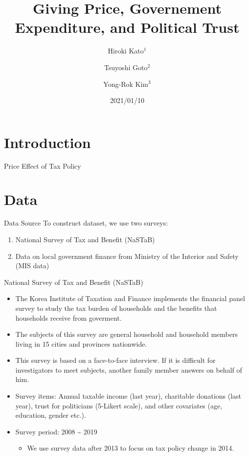 \documentclass[
  ignorenonframetext,
]{beamer}
\title{Giving Price, Governement Expenditure, and Political Trust}
\author{Hiroki Kato\(^1\) \and Tsuyoshi Goto\(^2\) \and Yong-Rok
Kim\(^3\)}
\date{2021/01/10}
\institute{\(^1\)Osaka University \and \(^2\)Chiba
University \and \(^3\)Kobe University}
\providecommand{\tightlist}{%
  \setlength{\itemsep}{0pt}\setlength{\parskip}{0pt}}
\begin{document}
\frame{\titlepage}

\hypertarget{introduction}{%
\section{Introduction}\label{introduction}}

\begin{frame}{Price Effect of Tax Policy}
\protect\hypertarget{price-effect-of-tax-policy}{}
\end{frame}

\hypertarget{data}{%
\section{Data}\label{data}}

\begin{frame}{Data Source}
\protect\hypertarget{data-source}{}
To construct dataset, we use two surveys:

\begin{enumerate}
\tightlist
\item
  National Survey of Tax and Benefit (NaSTaB)
\item
  Data on local government finance from Ministry of the Interior and
  Safety (MIS data)
\end{enumerate}
\end{frame}

\begin{frame}{National Survey of Tax and Benefit (NaSTaB)}
\protect\hypertarget{national-survey-of-tax-and-benefit-nastab}{}
\begin{itemize}
\tightlist
\item
  The Korea Institute of Taxation and Finance implements the financial
  panel survey to study the tax burden of households and the benefits
  that households receive from goverment.
\item
  The subjects of this survey are general household and household
  members living in 15 cities and provinces nationwide.
\item
  This survey is based on a face-to-face interview. If it is difficult
  for investigators to meet subjects, another family member answers on
  behalf of him.
\item
  Survey items: Annual taxable income (last year), charitable donations
  (last year), trust for politicians (5-Likert scale), and other
  covariates (age, education, gender etc.).
\item
  Survey period: 2008 \textasciitilde{} 2019

  \begin{itemize}
  \tightlist
  \item
    We use survey data after 2013 to focus on tax policy change in 2014.
  \end{itemize}
\end{itemize}
\end{frame}
\end{document}
